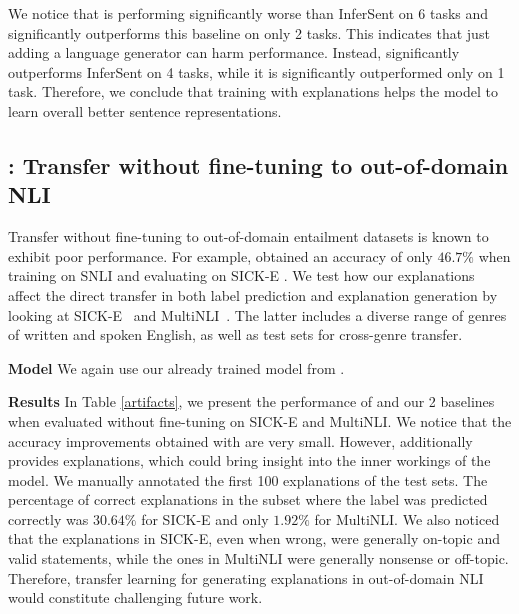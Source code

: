 We notice that \inferSentAutoencoder{} is performing significantly worse than InferSent on 6 tasks and significantly outperforms this baseline on only 2 tasks. This indicates that just adding a language generator can harm performance. Instead, \eInferSent{} significantly outperforms InferSent on 4 tasks, while it is significantly outperformed only on 1 task. Therefore, we conclude that training with explanations helps the model to learn overall better sentence representations.

\subsection{\expfour{}: Transfer without fine-tuning to out-of-domain NLI}
\label{exp4}

Transfer without fine-tuning to out-of-domain entailment datasets is known to exhibit poor performance. For example, \citet{snli} obtained an accuracy of only $46.7\%$ when training on SNLI and evaluating on SICK-E \cite{sick}. We test how our explanations affect the direct transfer in both label prediction and explanation generation by looking at SICK-E~\cite{sick} and MultiNLI~\cite{multinli}. The latter includes a diverse range of genres of written and spoken English, as well as test sets for cross-genre transfer.

\textbf{Model   } We again use our already trained \eInferSent{} model from \expone.

\textbf{Results   } In Table \ref{artifacts}, we present the performance of \eInferSent{} and our 2 baselines when evaluated without fine-tuning on SICK-E and MultiNLI. We notice that the accuracy improvements obtained with \eInferSent{} are very small. However, \eInferSent{} additionally provides explanations, which could bring insight into the inner workings of the model. We manually annotated the first 100 explanations of the test sets. The percentage of correct explanations in the subset where the label was predicted correctly was $30.64\%$ for SICK-E and only $1.92\%$ for MultiNLI.
We also noticed that the explanations in SICK-E, even when wrong, were generally on-topic and valid statements, while the ones in MultiNLI were generally nonsense or off-topic. Therefore, transfer learning for generating explanations in out-of-domain NLI would constitute challenging future work.

